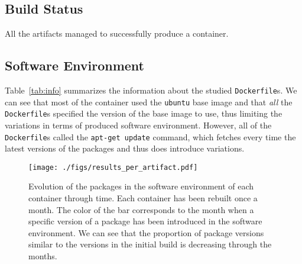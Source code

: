 \documentclass[sigconf,natbib=false]{acmart}
\newcommand{\df}{\texttt{Dockerfile}}
\begin{document}
\subsection{Build Status}

All the artifacts managed to successfully produce a container.

\subsection{Software Environment}

\begin{table}
  \centering
  \caption{Information about the \df s from the study.}\label{tab:info}
\end{table}

Table~\ref{tab:info} summarizes the information about the studied \df s.
We can see that most of the container used the \texttt{ubuntu} base image and that \emph{all} the \df s specified the version of the base image to use, thus limiting the variations in terms of produced software environment.
However, all of the \df s called the \texttt{apt-get update} command, which fetches every time the latest versions of the packages and thus does introduce variations.

\begin{figure*}
  \centering
  \texttt{[image: ./figs/results\_per\_artifact.pdf]}
  \caption{
    Evolution of the packages in the software environment of each container through time.
    Each container has been rebuilt once a month.
    The color of the bar corresponds to the month when a specific version of a package has been introduced in the software environment.
    We can see that the proportion of package versions similar to the versions in the initial build is decreasing through the months.
  }
  \label{fig:results_per_artifact}
\end{figure*}
\end{document}
